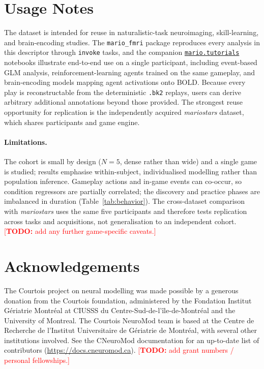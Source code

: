 \documentclass{article}
\newcommand{\TODO}[1]{\textcolor{red}{[\textbf{TODO:} #1]}}
\begin{document}
\section*{Usage Notes}
\label{sec:usage}

The dataset is intended for reuse in naturalistic-task neuroimaging, skill-learning, and
brain-encoding studies. The \texttt{mario\_fmri} package reproduces every analysis in this
descriptor through \texttt{invoke} tasks, and the companion
\href{https://github.com/courtois-neuromod/mario.tutorials}{\texttt{mario.tutorials}} notebooks
illustrate end-to-end use on a single participant, including event-based GLM analysis,
reinforcement-learning agents trained on the same gameplay, and brain-encoding models mapping
agent activations onto BOLD. Because every play is reconstructable from the deterministic
\texttt{.bk2} replays, users can derive arbitrary additional annotations beyond those provided.
The strongest reuse opportunity for replication is the independently acquired \textit{mariostars}
dataset, which shares participants and game engine.

\paragraph{Limitations.}
The cohort is small by design ($N=5$, dense rather than wide) and a single game is studied;
results emphasise within-subject, individualised modelling rather than population inference.
Gameplay actions and in-game events can co-occur, so condition regressors are partially
correlated; the discovery and practice phases are imbalanced in
duration (Table~\ref{tab:behavior}). The cross-dataset comparison with \textit{mariostars}
uses the same five participants and therefore tests replication across tasks and acquisitions,
not generalisation to an independent cohort. \TODO{add any further game-specific caveats.}


\section*{Acknowledgements}
The Courtois project on neural modelling was made possible by a generous donation from the
Courtois foundation, administered by the Fondation Institut Gériatrie Montréal at CIUSSS du
Centre-Sud-de-l'île-de-Montréal and the University of Montreal. The Courtois NeuroMod team is
based at the Centre de Recherche de l'Institut Universitaire de Gériatrie de Montréal, with
several other institutions involved. See the CNeuroMod documentation for an up-to-date list of
contributors (\url{https://docs.cneuromod.ca}). \TODO{add grant numbers / personal fellowships.}
\end{document}
